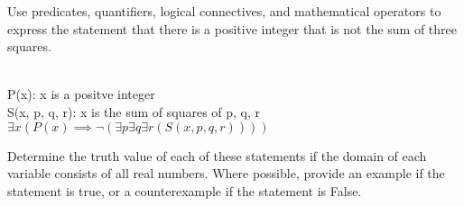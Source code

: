 \documentclass[a4paper]{exam}
\begin{document}
\begin{questions}
\begin{parts}
\begin{solution}
    \end{solution}
  \end{parts}
  
  \question Use predicates, quantifiers, logical connectives, and mathematical operators to express the statement that there is a positive integer that is not the sum of three squares.
    \begin{solution}\\
      P(x): x is a positve integer\\
      S(x, p, q, r): x is the sum of squares of p, q, r\\
      $\exists x(P(x) \implies \lnot(\exists p \exists q \exists r(S(x, p, q, r))))$

    \end{solution}

  \question Determine the truth value of each of these statements if the domain of each variable consists of all real numbers. Where possible, provide an example if the statement is true, or a counterexample if the statement is False.
\end{questions}
\end{document}
